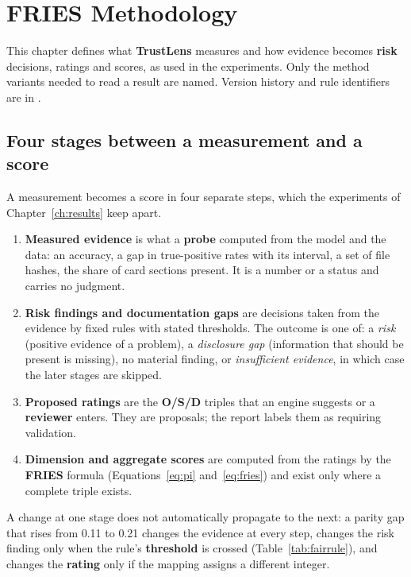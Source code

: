 \chapter{FRIES Methodology}\label{ch:fries}

This chapter defines what \textbf{TrustLens} measures and how evidence becomes \textbf{risk} decisions, ratings and scores, as used in the experiments. Only the method variants needed to read a result are named. Version history and rule identifiers are in .

\section{Four stages between a measurement and a score}\label{sec:stages}
A measurement becomes a score in four separate steps, which the experiments of Chapter~\ref{ch:results} keep apart.

\begin{enumerate}[nosep]
\item \textbf{Measured evidence} is what a \textbf{probe} computed from the model and the data: an accuracy, a gap in true-positive rates with its interval, a set of file hashes, the share of card sections present. It is a number or a status and carries no judgment.
\item \textbf{Risk findings and documentation gaps} are decisions taken from the evidence by fixed rules with stated thresholds. The outcome is one of: a \emph{risk} (positive evidence of a problem), a \emph{disclosure gap} (information that should be present is missing), no material finding, or \emph{insufficient evidence}, in which case the later stages are skipped.
\item \textbf{Proposed ratings} are the \textbf{O/S/D} triples that an engine suggests or a \textbf{reviewer} enters. They are proposals; the report labels them as requiring validation.
\item \textbf{Dimension and aggregate scores} are computed from the ratings by the \textbf{FRIES} formula (Equations~\ref{eq:pi} and~\ref{eq:fries}) and exist only where a complete triple exists.
\end{enumerate}

A change at one stage does not automatically propagate to the next: a parity gap that rises from 0.11 to 0.21 changes the evidence at every step, changes the risk finding only when the rule's \textbf{threshold} is crossed (Table~\ref{tab:fairrule}), and changes the \textbf{rating} only if the mapping assigns a different integer.


